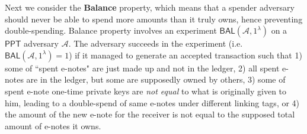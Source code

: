 \documentclass{article}
\theoremstyle{plain}
\theoremstyle{remark}
\begin{document}
Next we consider the \textbf{Balance} property, which means that a spender adversary should never be able to spend more amounts than it truly owns, hence preventing double-spending. Balance property involves an experiment $\textsf{BAL}(\mathcal{A}, 1^{\lambda})$  on a $\textsf{PPT}$ adversary $\mathcal{A}$. The adversary succeeds in the experiment (i.e. $\textsf{BAL}(\mathcal{A}, 1^{\lambda})=1$) if it managed to generate an accepted transaction such that
1) some of ``spent e-notes" are just made up and not in the ledger, 2) all spent e-notes are in the ledger, but some are supposedly owned by others, 3) some of spent e-note one-time private keys are \textit{not equal} to what is originally given to him, leading to a double-spend of same e-notes under different linking tags, or 4) the amount of the new e-note for the receiver is not equal to the supposed total amount of e-notes it owns.
\end{document}

